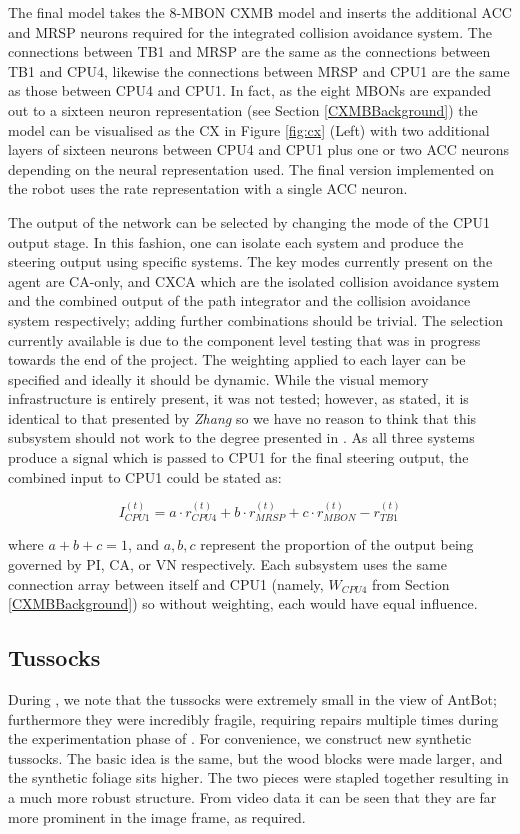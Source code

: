 \documentclass[a4paper,11pt,twoside,openright]{article}
\begin{document}
The final model takes the 8-MBON CXMB model and inserts the additional
ACC and MRSP neurons required for the integrated collision avoidance
system. The connections between TB1 and MRSP are the same as the
connections between TB1 and CPU4, likewise the connections between
MRSP and CPU1 are the same as those between CPU4 and CPU1. In fact, as
the eight MBONs are expanded out to a sixteen neuron representation
(see Section \ref{CXMBBackground}) the model can be visualised as the
CX in Figure \ref{fig:cx} (Left) with two additional layers of sixteen
neurons between CPU4 and CPU1 plus one or two ACC neurons depending on
the neural representation used. The final version implemented on the
robot uses the rate representation with a single ACC neuron.
\newline\par

The output of the network can be selected by changing the mode of the
CPU1 output stage. In this fashion, one can isolate each system and
produce the steering output using specific systems. The key modes
currently present on the agent are CA-only, and CXCA which are the
isolated collision avoidance system and the combined output of the
path integrator and the collision avoidance system respectively;
adding further combinations should be trivial. The selection currently
available is due to the component level testing that was in progress
towards the end of the project. The weighting applied to each layer
can be specified and ideally it should be dynamic. While the visual
memory infrastructure is entirely present, it was not tested; however,
as stated, it is identical to that presented by \textit{Zhang} so we
have no reason to think that this subsystem should not work to the
degree presented in \cite{Zhang2017}. As all three systems produce a
signal which is passed to CPU1 for the final steering output, the
combined input to CPU1 could be stated as:

\begin{equation}
  I_{CPU1}^{(t)} = a \cdot r_{CPU4}^{(t)} + b \cdot r_{MRSP}^{(t)} + c \cdot r_{MBON}^{(t)} - r_{TB1}^{(t)}
\end{equation}

where $a + b + c = 1$, and $a,b,c$ represent the proportion of the
output being governed by PI, CA, or VN respectively. Each subsystem
uses the same connection array between itself and CPU1 (namely,
$W_{CPU4}$ from Section \ref{CXMBBackground}) so without weighting,
each would have equal influence.

\subsection{Tussocks}
During \cite{Mitchell2018}, we note that the tussocks were extremely
small in the view of AntBot; furthermore they were incredibly
fragile, requiring repairs multiple times during the experimentation
phase of \cite{Mitchell2018}. For convenience, we construct new synthetic
tussocks. The basic idea is the same, but the wood blocks were made
larger, and the synthetic foliage sits higher. The two pieces were
stapled together resulting in a much more robust structure. From video
data it can be seen that they are far more prominent in the image
frame, as required.
\end{document}
